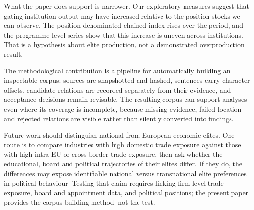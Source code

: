 \documentclass[11pt,a4paper]{article}
\begin{document}
What the paper does support is narrower. Our exploratory measures suggest that gating-institution output may have increased relative to the position stocks we can observe. The position-denominated chained index rises over the period, and the programme-level series show that this increase is uneven across institutions. That is a hypothesis about elite production, not a demonstrated overproduction result.

The methodological contribution is a pipeline for automatically building an inspectable corpus: sources are snapshotted and hashed, sentences carry character offsets, candidate relations are recorded separately from their evidence, and acceptance decisions remain revisable. The resulting corpus can support analyses even where its coverage is incomplete, because missing evidence, failed location and rejected relations are visible rather than silently converted into findings.

Future work should distinguish national from European economic elites. One route is to compare industries with high domestic trade exposure against those with high intra-EU or cross-border trade exposure, then ask whether the educational, board and political trajectories of their elites differ. If they do, the differences may expose identifiable national versus transnational elite preferences in political behaviour. Testing that claim requires linking firm-level trade exposure, board and appointment data, and political positions; the present paper provides the corpus-building method, not the test.



\end{document}

